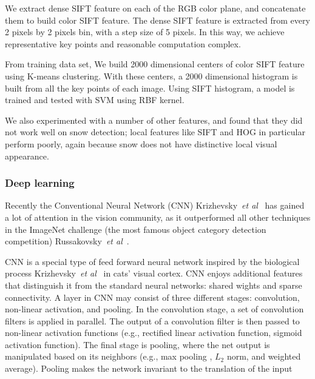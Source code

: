 We extract dense SIFT feature on each of the RGB color plane, and concatenate them to build color SIFT feature. The dense SIFT feature is extracted from every 2 pixels by 2 pixels bin, with a step size of 5 pixels. In this way, we achieve representative key points and reasonable computation complex. 

From training data set, We build 2000 dimensional centers of color SIFT feature using K-means clustering. With these centers, a 2000 dimensional histogram is built from all the key points of each image.
Using SIFT histogram, a model is trained and tested with SVM using RBF kernel. 


We also experimented with a number of other features, and found that they did not work well on snow detection; local features like SIFT and HOG in particular perform poorly, again because snow does not have distinctive local visual appearance. 







\subsubsection{Deep learning}
Recently the Conventional Neural Network (CNN) Krizhevsky~\textit{et al}~\cite{krizhevsky2012imagenet} has gained a lot of attention in the vision community, as it outperformed all other techniques in the ImageNet challenge (the most famous object category detection competition) Russakovsky~\textit{et al}~\cite{ilsvrcarxiv14}.



CNN is a special type of feed forward neural network inspired by the biological process Krizhevsky~\textit{et al}~\cite{krizhevsky2012imagenet} in cats' visual cortex. 
CNN enjoys additional features that distinguish it from the standard neural networks: shared wights and sparse connectivity.
A layer in CNN may consist of three different stages: convolution, non-linear activation, and pooling.
In the convolution stage, a set of convolution filters is applied in parallel. 
The output of a convolution filter is then passed to non-linear activation functions (e.g., rectified linear activation function, sigmoid activation function).
The final stage is pooling, where the net output is manipulated based on its neighbors (e.g., max pooling , $L_2$ norm, and weighted average).
Pooling makes the network invariant to the translation of the input

